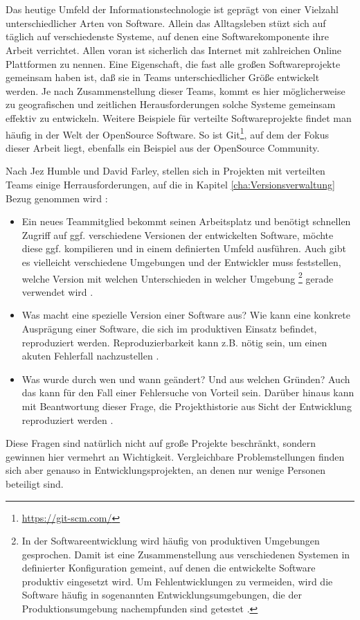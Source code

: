\chapter{\preamble}
\label{cha:preamble}
Das heutige Umfeld der Informationstechnologie ist gepr\"agt von einer Vielzahl
unterschiedlicher Arten von Software. Allein das Alltagsleben stüzt sich auf
täglich auf verschiedenste Systeme, auf denen eine Softwarekomponente ihre
Arbeit verrichtet.  Allen voran ist sicherlich das Internet mit zahlreichen
Online Plattformen zu nennen.  Eine Eigenschaft, die fast alle gro\ss{}en
Softwareprojekte gemeinsam haben ist, daß sie in Teams unterschiedlicher
Gr\"o\ss{}e entwickelt werden. Je nach Zusammenstellung dieser Teams, kommt es
hier möglicherweise zu geografischen und zeitlichen Herausforderungen solche
Systeme gemeinsam effektiv zu entwickeln.  Weitere Beispiele f\"ur verteilte
Softwareprojekte findet man h\"aufig in der Welt der \gls{OpenSource} Software.
So ist Git\footnote{\label{git:1}\url{https://git-scm.com/}}, auf dem der Fokus
dieser Arbeit liegt, ebenfalls ein Beispiel aus der \gls{OpenSource} Community. 

Nach Jez Humble und David Farley, stellen sich in Projekten mit verteilten
Teams einige Herrausforderungen, auf die in Kapitel
\ref{cha:Versionsverwaltung} Bezug genommen wird \cite[S.~26, 33]{cd}:
\begin{itemize}
  \item Ein neues Teammitglied bekommt seinen Arbeitsplatz und ben\"otigt
  schnellen Zugriff auf ggf. verschiedene Versionen der entwickelten Software,
  m\"ochte diese ggf. kompilieren und in einem definierten Umfeld ausf\"uhren.
  Auch gibt es vielleicht verschiedene Umgebungen und der Entwickler muss
  feststellen, welche Version mit welchen Unterschieden in welcher \gls{Umgebung}
  \footnote{\label{umgebung:1}In der Softwareentwicklung wird häufig von
  produktiven Umgebungen gesprochen. Damit ist eine Zusammenstellung aus
  verschiedenen Systemen in definierter Konfiguration gemeint, auf denen die
  entwickelte Software produktiv eingesetzt wird. Um Fehlentwicklungen zu
  vermeiden, wird die Software häufig in sogenannten Entwicklungsumgebungen,
  die der Produktionsumgebung nachempfunden sind getestet \cite[S.~49,
  250]{cd}.} gerade verwendet wird \citep[S.~26]{cd}.
  \item Was macht eine spezielle Version einer Software aus? Wie kann eine
  konkrete Auspr\"agung einer Software, die sich im produktiven Einsatz
  befindet, reproduziert werden. Reproduzierbarkeit kann z.B. n\"otig sein, um
  einen akuten Fehlerfall nachzustellen \cite[s.~33]{cd}.
  \item Was wurde durch wen und wann ge\"andert? Und aus welchen Gr\"unden?
  Auch das kann f\"ur den Fall einer Fehlersuche von Vorteil sein. Darüber
  hinaus kann mit Beantwortung dieser Frage, die Projekthistorie aus Sicht der
  Entwicklung reproduziert werden \cite[S.~33]{cd}.
\end{itemize}
Diese Fragen sind natürlich nicht auf große Projekte beschränkt, sondern
gewinnen hier vermehrt an Wichtigkeit. Vergleichbare Problemstellungen finden
sich aber genauso in Entwicklungsprojekten, an denen nur wenige Personen
beteiligt sind. 

